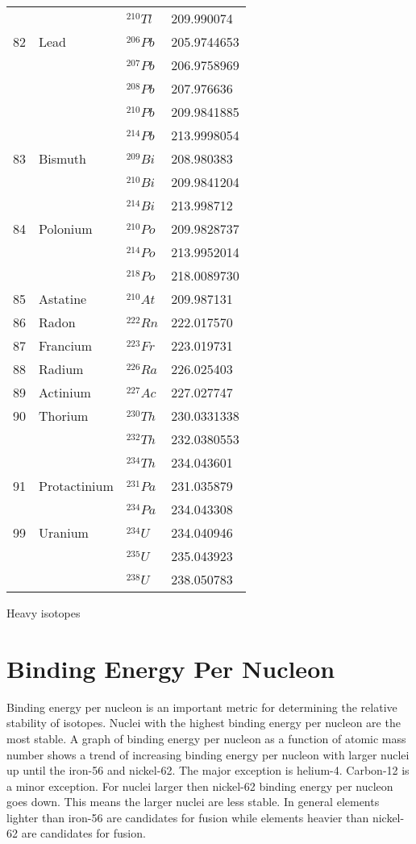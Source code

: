\begin{margintable}[20pt]
\begin{center}
\begin{tabular}{clll}
      & & ${}^{210}Tl$ & 209.990074 \\
      82   & Lead & ${}^{206}Pb$ & 205.9744653 \\
      & & ${}^{207}Pb$ & 206.9758969 \\
      & & ${}^{208}Pb$ & 207.976636 \\
      & & ${}^{210}Pb$ & 209.9841885 \\
      & & ${}^{214}Pb$ & 213.9998054 \\
      83   & Bismuth & ${}^{209}Bi$ & 208.980383 \\
      &  & ${}^{210}Bi$ & 209.9841204 \\
      &  & ${}^{214}Bi$ & 213.998712 \\
      84   & Polonium & ${}^{210}Po$ & 209.9828737 \\
      & & ${}^{214}Po$ & 213.9952014 \\
      & & ${}^{218}Po$ & 218.0089730 \\
      85   & Astatine & ${}^{210}At$ & 209.987131 \\
      86   & Radon & ${}^{222}Rn$ & 222.017570 \\
      87   & Francium & ${}^{223}Fr$ & 223.019731 \\
      88   & Radium & ${}^{226}Ra$ & 226.025403 \\
      89   & Actinium & ${}^{227}Ac$ & 227.027747 \\
      90   & Thorium & ${}^{230}Th$ & 230.0331338 \\
      & & ${}^{232}Th$ & 232.0380553 \\
      & & ${}^{234}Th$ & 234.043601 \\
      91   & Protactinium & ${}^{231}Pa$ & 231.035879 \\
      & & ${}^{234}Pa$ & 234.043308 \\
      99   & Uranium & ${}^{234}U$ & 234.040946 \\
       & & ${}^{235}U$ & 235.043923 \\
       & & ${}^{238}U$ & 238.050783 \\  
      \bottomrule
    \end{tabular}
  \end{center}
  \caption{Heavy isotopes}
  \label{tab:font-sizes}
\end{margintable}
\section{Binding Energy Per Nucleon}
Binding energy per nucleon is an important metric for determining the relative stability of isotopes.  Nuclei with the highest binding energy per nucleon are the most stable.  
A graph of binding energy per nucleon as a function of atomic mass number shows a trend of increasing binding energy per nucleon with larger nuclei up until the iron-56 and nickel-62.  The major exception is helium-4.  Carbon-12 is a minor exception.  
For nuclei larger then nickel-62 binding energy per nucleon goes down.  This means the larger nuclei are less stable.  In general elements lighter than iron-56 are candidates for fusion while elements heavier than nickel-62 are candidates for fusion.

